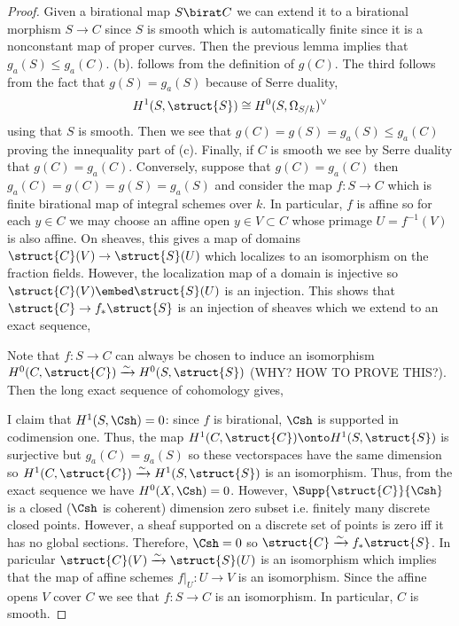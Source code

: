 \documentclass[12pt]{article}
\begin{document}
\begin{proof}
Given a birational map $S \birat C$ we can extend it to a birational morphism $S \to C$ since $S$ is smooth which is automatically finite since it is a nonconstant map of proper curves. Then the previous lemma implies that $g_a(S) \le g_a(C)$. (b). follows from the definition of $g(C)$. The third follows from the fact that $g(S) = g_a(S)$  because of Serre duality, 
\[ H^1(S, \struct{S}) \cong H^0(S, \Omega_{S / k})^\vee \]
using that $S$ is smooth. Then we see that $g(C) = g(S) = g_a(S) \le g_a(C)$ proving the innequality part of (c). Finally, if $C$ is smooth we see by Serre duality that $g(C) = g_a(C)$. Conversely, suppose that $g(C) = g_a(C)$ then $g_a(C) = g(C) = g(S) = g_a(S)$ and consider the map $f : S \to C$ which is finite birational map of integral schemes over $k$. In particular, $f$ is affine so for each $y \in C$ we may choose an affine open $y \in V \subset C$ whose primage $U = f^{-1}(V)$ is also affine. On sheaves, this gives a map of domains $\struct{C}(V) \to \struct{S}(U)$ which localizes to an isomorphism on the fraction fields. However, the localization map of a domain is injective so $\struct{C}(V) \embed \struct{S}(U)$ is an injection. This shows that $\struct{C} \to f_* \struct{S}$ is an injection of sheaves which we extend to an exact sequence,
\begin{center}
\end{center} 
Note that $f : S \to C$ can always be chosen to induce an isomorphism $H^0(C, \struct{C}) \xrightarrow{\sim} H^0(S, \struct{S})$ (WHY? HOW TO PROVE THIS?). Then the long exact sequence of cohomology gives,
\begin{center}
\end{center}
I claim that $H^1(S, \Csh) = 0$: since $f$ is birational, $\Csh$ is supported in codimension one. Thus, the map $H^1(C, \struct{C}) \onto H^1(S, \struct{S})$ is surjective but $g_a(C) = g_a(S)$ so these vectorspaces have the same dimension so $H^1(C, \struct{C}) \xrightarrow{\sim} H^1(S, \struct{S})$ is an isomorphism. Thus, from the exact sequence we have $H^0(X, \Csh) = 0$. However, $\Supp{\struct{C}}{\Csh}$ is a closed ($\Csh$ is coherent) dimension zero subset i.e. finitely many discrete closed points. However, a sheaf supported on a discrete set of points is zero iff it has no global sections. Therefore, $\Csh = 0$ so $\struct{C} \xrightarrow{\sim} f_* \struct{S}$. In paricular $\struct{C}(V) \xrightarrow{\sim} \struct{S}(U)$ is an isomorphism which implies that the map of affine schemes $f|_U : U \to V$ is an isomorphism. Since the affine opens $V$ cover $C$ we see that $f : S \to C$ is an isomorphism. In particular, $C$ is smooth. 
\end{proof}
\end{document}
